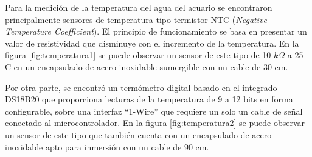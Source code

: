 

Para la medición de la temperatura del agua del acuario se encontraron principalmente sensores de temperatura tipo termistor NTC (\textit{Negative Temperature Coefficient}). El principio de funcionamiento se basa en presentar un valor de resistividad que disminuye con el incremento de la temperatura.  En la figura \ref{fig:temperatura1} se puede observar un sensor de este tipo de 10 $k\Omega$ a 25 \grados C en un encapsulado de acero inoxidable sumergible con un cable de 30 cm.  

Por otra parte, se encontró un termómetro digital basado en el integrado DS18B20 que proporciona lecturas de la temperatura de 9 a 12 bits en forma configurable, sobre una interfaz ``1-Wire'' \citep{dallas:ds18b20} que requiere un solo un cable de señal conectado al microcontrolador. En la figura \ref{fig:temperatura2} se puede observar un sensor de este tipo que también cuenta con un encapsulado de acero inoxidable apto para inmersión con un cable de 90 cm.

\vspace{10px}

